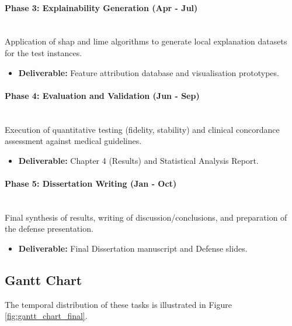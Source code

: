 \paragraph{Phase 3: Explainability Generation (Apr - Jul)} \mbox{} \\
Application of \gls{shap} and \gls{lime} algorithms to generate local explanation datasets for the test instances.
\begin{itemize}
    \item \textbf{Deliverable:} Feature attribution database and visualisation prototypes.
\end{itemize}

\paragraph{Phase 4: Evaluation and Validation (Jun - Sep)} \mbox{} \\
Execution of quantitative testing (\gls{fidelity}, \gls{stability}) and clinical concordance assessment against medical guidelines.
\begin{itemize}
    \item \textbf{Deliverable:} Chapter 4 (Results) and Statistical Analysis Report.
\end{itemize}

\paragraph{Phase 5: Dissertation Writing (Jan - Oct)} \mbox{} \\
Final synthesis of results, writing of discussion/conclusions, and preparation of the defense presentation.
\begin{itemize}
    \item \textbf{Deliverable:} Final Dissertation manuscript and Defense slides.
\end{itemize}

\subsection{Gantt Chart}
The temporal distribution of these tasks is illustrated in Figure \ref{fig:gantt_chart_final}.

